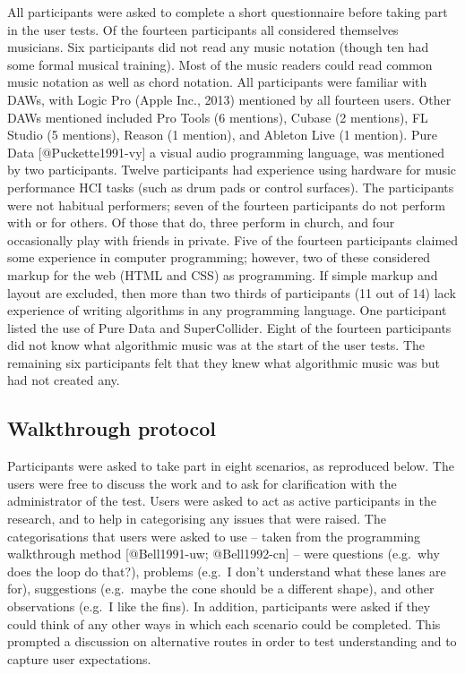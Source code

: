 \documentclass[]{article}
\begin{document}
All participants were asked to complete a short questionnaire before
taking part in the user tests. Of the fourteen participants all
considered themselves musicians. Six participants did not read any music
notation (though ten had some formal musical training). Most of the
music readers could read common music notation as well as chord
notation. All participants were familiar with DAWs, with Logic Pro
(Apple Inc., 2013) mentioned by all fourteen users. Other DAWs mentioned
included Pro Tools (6 mentions), Cubase (2 mentions), FL Studio (5
mentions), Reason (1 mention), and Ableton Live (1 mention). Pure Data
{[}@Puckette1991-vy{]} a visual audio programming language, was
mentioned by two participants. Twelve participants had experience using
hardware for music performance HCI tasks (such as drum pads or control
surfaces). The participants were not habitual performers; seven of the
fourteen participants do not perform with or for others. Of those that
do, three perform in church, and four occasionally play with friends in
private. Five of the fourteen participants claimed some experience in
computer programming; however, two of these considered markup for the
web (HTML and CSS) as programming. If simple markup and layout are
excluded, then more than two thirds of participants (11 out of 14) lack
experience of writing algorithms in any programming language. One
participant listed the use of Pure Data and SuperCollider. Eight of the
fourteen participants did not know what algorithmic music was at the
start of the user tests. The remaining six participants felt that they
knew what algorithmic music was but had not created any.

\hypertarget{walkthrough-protocol}{%
\subsection{Walkthrough protocol}\label{walkthrough-protocol}}

Participants were asked to take part in eight scenarios, as reproduced
below. The users were free to discuss the work and to ask for
clarification with the administrator of the test. Users were asked to
act as active participants in the research, and to help in categorising
any issues that were raised. The categorisations that users were asked
to use -- taken from the programming walkthrough method {[}@Bell1991-uw;
@Bell1992-cn{]} -- were questions (e.g.~why does the loop do that?),
problems (e.g.~I don't understand what these lanes are for), suggestions
(e.g.~maybe the cone should be a different shape), and other
observations (e.g.~I like the fins). In addition, participants were
asked if they could think of any other ways in which each scenario could
be completed. This prompted a discussion on alternative routes in order
to test understanding and to capture user expectations.
\end{document}
